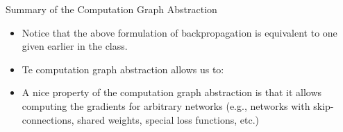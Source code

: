 \documentclass[handout]{beamer}
\begin{document}
\begin{frame}{Summary of the Computation Graph Abstraction}
\begin{scriptsize}
\begin{itemize}

\item Notice that the above formulation of backpropagation is equivalent to one given earlier in the class.

\item  Te computation graph abstraction allows us to:


\begin{enumerate}
 \end{enumerate}
  
  
\item A nice property of the computation graph abstraction is that it allows computing the gradients for arbitrary networks (e.g., networks with skip-connections, shared weights, special loss functions, etc.)
 
  
 
  
\end{itemize}
\end{scriptsize}
\end{frame}
\end{document}
